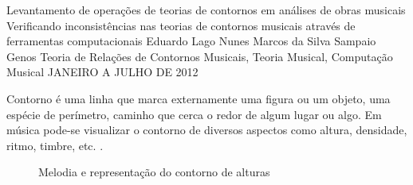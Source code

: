 \documentclass[11pt]{article}
\begin{document}
\graphicspath{{figs/}}


\dadosRelatorioFinal
{Levantamento de operações de teorias de contornos em análises de
  obras musicais}
{Verificando inconsistências nas teorias de contornos musicais através
  de ferramentas computacionais }
{Eduardo Lago Nunes}
{Marcos da Silva Sampaio}
{Genos}
{Teoria de Relações de Contornos Musicais, Teoria Musical, Computação Musical}
{JANEIRO A JULHO DE 2012}


\newpage

\setcounter{page}{1}
\onehalfspace

\label{sec:introducao}

Contorno é uma linha que marca externamente uma figura ou um objeto,
uma espécie de perímetro, caminho que cerca o redor de algum lugar ou
algo. Em música pode-se visualizar o contorno de diversos aspectos
como altura, densidade, ritmo, timbre, etc.
\cite[p. 01]{Sampaio2008}.

\begin{figure}
  \centering
  \caption{Melodia e representação do contorno de alturas}
  \label{fig:melodia-representacao}
\end{figure}
\end{document}
